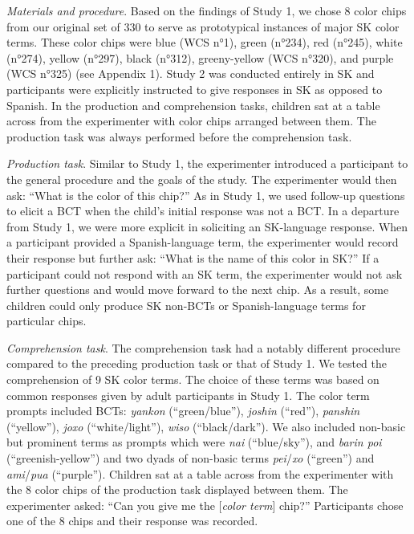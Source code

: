\documentclass[
  english,
  ,man,floatsintext]{apa6}
\begin{document}
\emph{Materials and procedure}. Based on the findings of Study 1, we chose 8 color chips from our original set of 330 to serve as prototypical instances of major SK color terms. These color chips were blue (WCS n°1), green (n°234), red (n°245), white (n°274), yellow (n°297), black (n°312), greeny-yellow (WCS n°320), and purple (WCS n°325) (see Appendix 1). Study 2 was conducted entirely in SK and participants were explicitly instructed to give responses in SK as opposed to Spanish. In the production and comprehension tasks, children sat at a table across from the experimenter with color chips arranged between them. The production task was always performed before the comprehension task.

\emph{Production task}. Similar to Study 1, the experimenter introduced a participant to the general procedure and the goals of the study. The experimenter would then ask: \enquote{What is the color of this chip?} As in Study 1, we used follow-up questions to elicit a BCT when the child's initial response was not a BCT. In a departure from Study 1, we were more explicit in soliciting an SK-language response. When a participant provided a Spanish-language term, the experimenter would record their response but further ask: \enquote{What is the name of this color in SK?} If a participant could not respond with an SK term, the experimenter would not ask further questions and would move forward to the next chip. As a result, some children could only produce SK non-BCTs or Spanish-language terms for particular chips.

\emph{Comprehension task}. The comprehension task had a notably different procedure compared to the preceding production task or that of Study 1. We tested the comprehension of 9 SK color terms. The choice of these terms was based on common responses given by adult participants in Study 1. The color term prompts included BCTs: \emph{yankon} (\enquote{green/blue}), \emph{joshin} (\enquote{red}), \emph{panshin} (\enquote{yellow}), \emph{joxo} (\enquote{white/light}), \emph{wiso} (\enquote{black/dark}). We also included non-basic but prominent terms as prompts which were \emph{nai} (\enquote{blue/sky}), and \emph{barin poi} (\enquote{greenish-yellow}) and two dyads of non-basic terms \emph{pei}/\emph{xo} (\enquote{green}) and \emph{ami}/\emph{pua} (\enquote{purple}). Children sat at a table across from the experimenter with the 8 color chips of the production task displayed between them. The experimenter asked: \enquote{Can you give me the {[}\emph{color term}{]} chip?} Participants chose one of the 8 chips and their response was recorded.
\end{document}
